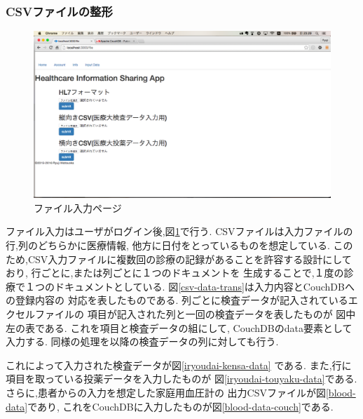 		\subsubsection{CSVファイルの整形}

			\begin{figure}[htbp]
					\includegraphics[width=15cm, bb=0 0 1366 1078, clip]{./gazou/fileiopage.png}
				\caption{ファイル入力ページ}
				\label{fileiopage}
			\end{figure}
			ファイル入力はユーザがログイン後,図\ref{fileiopage}で行う.
			CSVファイルは入力ファイルの行,列のどちらかに医療情報,
			他方に日付をとっているものを想定している.
			このため,CSV入力ファイルに複数回の診療の記録があることを許容する設計にしており,
			行ごとに,または列ごとに１つのドキュメントを
			生成することで,１度の診療で１つのドキュメントとしている.
			図\ref{csv-data-trans}は入力内容とCouchDBへの登録内容の
			対応を表したものである.
			列ごとに検査データが記入されているエクセルファイルの
			項目が記入された列と一回の検査データを表したものが
			図中左の表である.
			これを項目と検査データの組にして,
			CouchDBのdata要素として入力する.
			同様の処理を以降の検査データの列に対しても行う.

			これによって入力された検査データが図\ref{iryoudai-kensa-data}
			である.
			また,行に項目を取っている投薬データを入力したものが
			図\ref{iryoudai-touyaku-data}である.
			さらに,患者からの入力を想定した家庭用血圧計の
			出力CSVファイルが図\ref{blood-data}であり,
			これをCouchDBに入力したものが図\ref{blood-data-couch}である.



